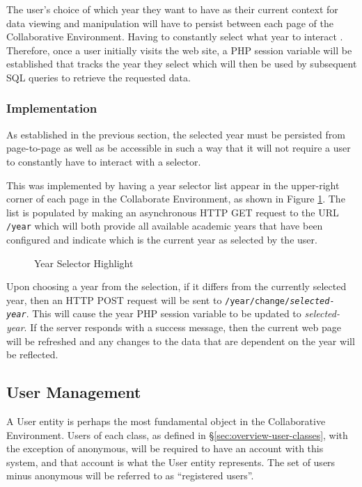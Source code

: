 The user's choice of which year they want to have as their current context for data viewing and manipulation will have to persist between each page of the Collaborative Environment. Having to constantly select what year to interact . Therefore, once a user initially visits the web site, a PHP session variable will be established that tracks the year they select which will then be used by subsequent SQL queries to retrieve the requested data.

\subsubsection{Implementation}
As established in the previous section, the selected year must be persisted from page-to-page as well as be accessible in such a way that it will not require a user to constantly have to interact with a selector.

This was implemented by having a year selector list appear in the upper-right corner of each page in the Collaborate Environment, as shown in Figure \ref{fig:screens-year}. The list is populated by making an asynchronous HTTP GET request to the URL \texttt{/year} which will both provide all available academic years that have been configured and indicate which is the current year as selected by the user.

\begin{figure}[h!]
	\centering
	\caption{Year Selector Highlight}
	\label{fig:screens-year}
\end{figure}

Upon choosing a year from the selection, if it differs from the currently selected year, then an HTTP POST request will be sent to \texttt{/year/change/\textit{selected-year}}. This will cause the year PHP session variable to be updated to \emph{selected-year}. If the server responds with a success message, then the current web page will be refreshed and any changes to the data that are dependent on the year will be reflected.

\subsection{User Management}
\label{subsec:design-user}
A User entity is perhaps the most fundamental object in the Collaborative Environment.  Users of each class, as defined in \S \ref{sec:overview-user-classes}, with the exception of anonymous, will be required to have an account with this system, and that account is what the User entity represents. The set of users minus anonymous will be referred to as ``registered users''.

